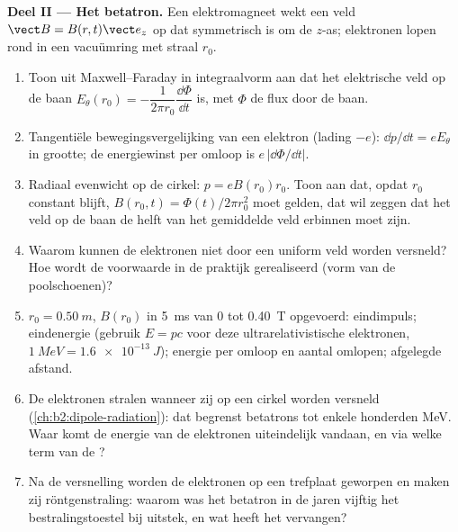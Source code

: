 \begin{problem}
\medskip
\noindent\textbf{Deel II --- Het betatron.}
Een elektromagneet wekt een veld $\vect B = B(r, t)\vect e_z$ op dat
symmetrisch is om de $z$-as; elektronen lopen rond in een vacuümring met
straal $r_0$.
\begin{enumerate}[resume]
  \item Toon uit Maxwell--Faraday in integraalvorm aan dat het elektrische
        veld op de baan
        $E_\theta(r_0) = -\dfrac1{2\pi r_0}
        \dfrac{\dd\Phi}{\dd t}$ is, met
        $\Phi$ de flux door de baan.
  \item Tangentiële bewegingsvergelijking van een elektron (lading $-e$):
        $\dd p/\dd t = eE_\theta$ in grootte; de energiewinst per omloop is
        $e\,|\dd\Phi/\dd t|$.
  \item Radiaal evenwicht op de cirkel: $p = eB(r_0)r_0$. Toon aan dat,
        opdat $r_0$ constant blijft, $B(r_0, t) = \Phi(t)/2\pi r_0^2$ moet
        gelden, dat wil zeggen dat het veld op de baan de helft van het
        gemiddelde veld erbinnen moet zijn.
  \item Waarom kunnen de elektronen niet door een uniform veld worden
        versneld? Hoe wordt de voorwaarde in de praktijk gerealiseerd (vorm
        van de poolschoenen)?
  \item $r_0 = \qty{0.50}{m}$, $B(r_0)$ in \qty{5}{ms} van $0$ tot
        \qty{0.40}{T} opgevoerd: eindimpuls; eindenergie (gebruik $E = pc$
        voor deze ultrarelativistische elektronen,
        $\qty{1}{MeV} = \qty{1.6e-13}{J}$); energie per omloop en aantal
        omlopen; afgelegde afstand.
  \item De elektronen stralen wanneer zij op een cirkel worden versneld
        (\cref{ch:b2:dipole-radiation}): dat begrenst betatrons tot enkele
        honderden MeV. Waar komt de energie van de elektronen uiteindelijk
        vandaan, en via welke term van de ?
  \item Na de versnelling worden de elektronen op een trefplaat geworpen en
        maken zij röntgenstraling: waarom was het betatron in de jaren
        vijftig het bestralingstoestel bij uitstek, en wat heeft het
        vervangen?
\end{enumerate}


\end{problem}
